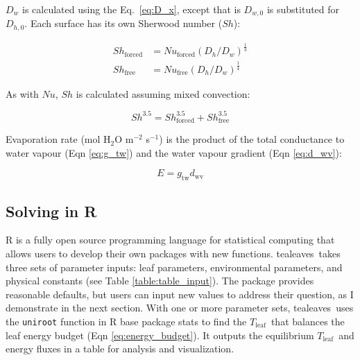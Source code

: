 \documentclass[11pt, oneside]{article}
\newcommand{\pkg}[1]{{\fontseries{b}\selectfont #1}}
\newcommand{\code}[1]{{\texttt{#1}}}
\newcommand{\tealeaves}{\pkg{tealeaves}}
\newcommand{\tleaf}{$T_\mathrm{leaf}$}
\begin{document}
$D_w$ is calculated using the Eq.~\ref{eq:D_x}, except that is $D_{w,0}$ is substituted for $D_{h,0}$. Each surface has its own Sherwood number ($\mathit{Sh}$):

\begin{align}
  \mathit{Sh}_\mathrm{forced} & = \mathit{Nu}_\mathrm{forced} (D_h / D_w) ^ \frac{1}{3} \\
  \mathit{Sh}_\mathrm{free} & = \mathit{Nu}_\mathrm{free} (D_h / D_w) ^ \frac{1}{4}
\end{align}

As with $\mathit{Nu}$, $\mathit{Sh}$ is calculated assuming mixed convection:

\begin{equation}
  \label{eq:sherwood}
  \mathit{Sh} ^ {3.5} = \mathit{Sh}_\mathrm{forced} ^ {3.5} + \mathit{Sh}_\mathrm{free} ^ {3.5}
\end{equation}

Evaporation rate (mol H$_2$O m$^{-2}$ s$^{-1}$) is the product of the total conductance to water vapour (Eqn \ref{eq:g_tw}) and the water vapour gradient (Eqn \ref{eq:d_wv}):

\begin{equation}
  E = g_\mathrm{tw} d_\mathrm{wv}
\end{equation}

\subsection*{Solving in R}

R is a fully open source programming language for statistical computing that allows users to develop their own packages with new functions. \tealeaves~takes three sets of parameter inputs: leaf parameters, environmental parameters, and physical constants (see Table \ref{table:table_input}). The package provides reasonable defaults, but users can input new values to address their question, as I demonstrate in the next section. With one or more parameter sets, \tealeaves~uses the \code{uniroot} function in R base package \pkg{stats} to find the \tleaf~that balances the leaf energy budget (Eqn \ref{eq:energy_budget}). It outputs the equilibrium \tleaf~and energy fluxes in a table for analysis and visualization.
\end{document}
